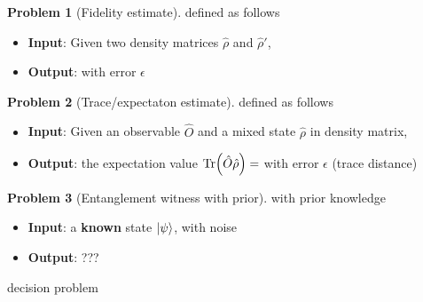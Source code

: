 \documentclass[
aps,
pra,
linenumbers,
floatfix,
]{revtex4-2}
\theoremstyle{plain}
\theoremstyle{definition}
\newtheorem{problem}{Problem}
\newcommand{\ob}{\hat{O}}
\newcommand{\dm}{\hat{\rho}}
\begin{document}
\begin{problem}[Fidelity estimate]
	defined as follows
	\begin{itemize}
		\item \textbf{Input}: Given two density matrices $\dm$ and $\dm'$, 
		\item \textbf{Output}:  with error $\epsilon$
	\end{itemize}
\end{problem}
\begin{problem}[Trace/expectaton estimate]
	defined as follows
	\begin{itemize}
		\item \textbf{Input}: Given an observable $\ob$ and a mixed state $\dm$ in density matrix,
		\item \textbf{Output}: the expectation value $\Tr(\ob \dm) = $ with error $\epsilon$ (trace distance)
	\end{itemize}
\end{problem}
\begin{problem}[Entanglement witness with prior]
	with prior knowledge
	\begin{itemize}
		\item \textbf{Input}: a \textbf{known} state $\ket{\psi}$, with noise
		\item \textbf{Output}: ???
	\end{itemize}
	decision problem
\end{problem}
\end{document}

